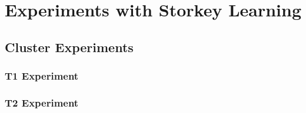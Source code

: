 \chapter{Experiments with Storkey Learning}


\section{Cluster Experiments}

\subsection{T1 Experiment}



\subsection{T2 Experiment}

